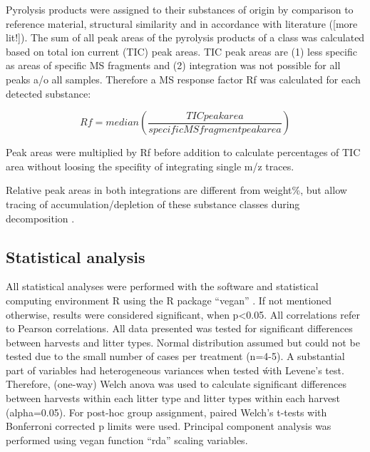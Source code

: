 Pyrolysis products were assigned to their substances of origin by comparison to reference material, structural similarity and in accordance with literature (\cite{Ralph1991a, Schellekens2009,Chiavari1992}[more lit!]). The sum of all peak areas of the pyrolysis products of a class was calculated based on total ion current (TIC) peak areas. TIC peak areas are (1) less specific as areas of specific MS fragments and (2) integration was not possible for all peaks a/o all samples. Therefore a MS response factor Rf was calculated for each detected substance:

\begin{equation}
Rf = median (\frac{TIC peak area}{specific MS fragment peak area})
\end{equation}

Peak areas were multiplied by Rf before addition to calculate percentages of TIC area without loosing the specifity of integrating single m/z traces.


Relative peak areas in both integrations are different from weight\%, but allow tracing of accumulation/depletion of these substance classes during decomposition \citep{Schellekens2009}. 




\subsection{Statistical analysis}
All statistical analyses were performed with the software and statistical computing environment R using the R package ``vegan'' \citep{Oksanen2011}. If not mentioned otherwise, results were considered significant, when p\textless 0.05. All correlations refer to Pearson correlations.
All data presented was tested for significant differences between harvests and litter types. Normal distribution assumed but could not be tested due to the small number of cases per treatment (n=4-5). A substantial part of variables had heterogeneous variances when tested ẃith Levene's test. Therefore, (one-way) Welch anova was used to calculate significant differences between harvests within each litter type and litter types within each harvest (alpha=0.05). For post-hoc group assignment, paired Welch's t-tests with Bonferroni corrected p limits were used. Principal component analysis was performed using vegan function ``rda'' scaling variables.
